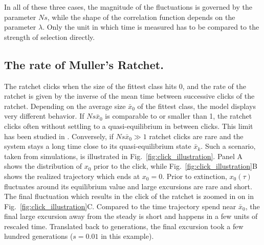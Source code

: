 \documentclass[rmp,preprint]{revtex4}
\newcommand{\FIG}[1]{Fig.~\ref{fig:#1}}
\newcommand{\x}{x}
\newcommand{\xs}{\bar{\x}}
\begin{document}
In all of these three cases, the magnitude of the fluctuations is governed by the parameter $Ns$, while the shape of the correlation function depends on the parameter $\lambda$. Only the unit in which time is measured has to be compared to the strength of selection directly.

\subsection*{The rate of Muller's Ratchet.}
The ratchet clicks when the size of the fittest class hits 0, and the rate of the ratchet is given by the inverse of the mean time between successive clicks of the ratchet. Depending on the average size $\xs_0$ of the fittest class, the model displays very different behavior. If $Ns\xs_0$ is comparable to or smaller than 1, the ratchet clicks often without settling to a quasi-equilibrium in between clicks. This limit has been studied in \citep{Rouzine:2008p20864}. Conversely, if $Ns\xs_0 \gg 1$ ratchet clicks are rare and the system stays a long time close to its quasi-equilibrium state $\xs_k$. Such a scenario, taken from simulations, is illustrated in \FIG{click_illustration}. Panel A shows the distribution of $\x_0$ prior to the click, while  \FIG{click_illustration}B shows the realized trajectory which ends at $\x_0=0$. Prior to extinction, $\x_0(\tau)$ fluctuates around its equilibrium value and large excursions are rare and short. The final fluctuation which results in the click of the ratchet is zoomed in on in \FIG{click_illustration}C. Compared to the time trajectory spend near $\xs_0$, the final large excursion away from the steady is short and happens in a few units of rescaled time. Translated back to generations, the final excursion took a few hundred generations ($s=0.01$ in this example).
\end{document}
